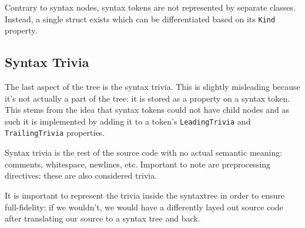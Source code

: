 Contrary to syntax nodes, syntax tokens are not represented by separate classes. Instead, a single struct exists which can be differentiated based on its \texttt{Kind} property. 

\subsection{Syntax Trivia}
\label{sec:syntax-trivia}

The last aspect of the tree is the syntax trivia. This is slightly misleading because it's not actually a part of the tree: it is stored as a property on a syntax token. This stems from the idea that syntax tokens could not have child nodes and as such it is implemented by adding it to a token's \texttt{LeadingTrivia} and \texttt{TrailingTrivia} properties. 

Syntax trivia is the rest of the source code with no actual semantic meaning: comments, whitespace, newlines, etc. Important to note are preprocessing directives: these are also considered trivia.

It is important to represent the trivia inside the \gls{syntaxtree} in order to ensure full-fidelity: if we wouldn't, we would have a differently layed out source code after translating our source to a syntax tree and back.




